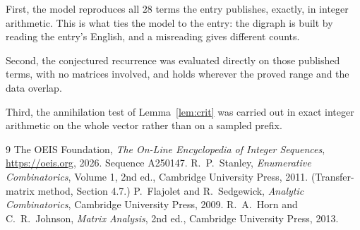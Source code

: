 \documentclass[11pt,a4paper]{article}
\theoremstyle{plain}
\theoremstyle{definition}
\begin{document}
First, the model reproduces all $28$ terms the entry publishes, exactly, in integer
arithmetic. This is what ties the model to the entry: the digraph is built by reading the
entry's English, and a misreading gives different counts.

Second, the conjectured recurrence was evaluated directly on those published terms, with no
matrices involved, and holds wherever the proved range and the data overlap.

Third, the annihilation test of Lemma~\ref{lem:crit} was carried out in exact integer
arithmetic on the whole vector rather than on a sampled prefix.

\begin{thebibliography}{9}
 The OEIS Foundation, \emph{The On-Line Encyclopedia of Integer
Sequences}, \url{https://oeis.org}, 2026. Sequence A250147.
 R.~P.~Stanley, \emph{Enumerative Combinatorics}, Volume 1, 2nd ed.,
Cambridge University Press, 2011. (Transfer-matrix method, Section 4.7.)
 P.~Flajolet and R.~Sedgewick, \emph{Analytic Combinatorics}, Cambridge
University Press, 2009.
 R.~A.~Horn and C.~R.~Johnson, \emph{Matrix Analysis}, 2nd ed., Cambridge
University Press, 2013.
\end{thebibliography}
\end{document}
